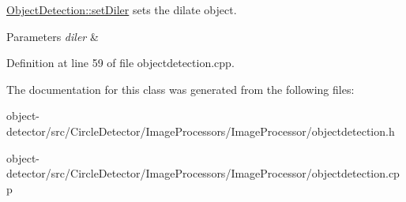 \hyperlink{class_image_processor_1_1_object_detection_a727fcf4d318c9a3ccb63348b957c1e94}{Object\+Detection\+::set\+Diler} sets the dilate object. 


\begin{DoxyParams}{Parameters}
{\em diler} & \\
\hline
\end{DoxyParams}


Definition at line 59 of file objectdetection.\+cpp.



The documentation for this class was generated from the following files\+:\begin{DoxyCompactItemize}
\item 
object-\/detector/src/\+Circle\+Detector/\+Image\+Processors/\+Image\+Processor/objectdetection.\+h\item 
object-\/detector/src/\+Circle\+Detector/\+Image\+Processors/\+Image\+Processor/objectdetection.\+cpp\end{DoxyCompactItemize}
